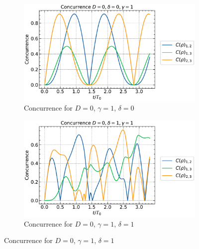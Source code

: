 \begin{figure}[h!]
    \centering
    \begin{subfigure}[b]{0.48\textwidth}
        \centering
        \includegraphics[width=\linewidth]{results_and_discussion/3_qubits/up_down_with_ana_0_1_0.pdf}
        \caption{Concurrence for \( D = 0\), \( \gamma = 1\), \( \delta = 0\)}
        \label{fig:subfig1}
    \end{subfigure}
    \hfill
    \begin{subfigure}[b]{0.48\textwidth}
        \centering
        \includegraphics[width=\linewidth]{results_and_discussion/3_qubits/up_down_with_ana_0_1_1.pdf}
        \caption{Concurrence for \( D = 0\), \( \gamma = 1\), \( \delta = 1\)}
        \label{fig:subfig2}
    \end{subfigure}

    \vspace{0.5cm}


\end{figure}
